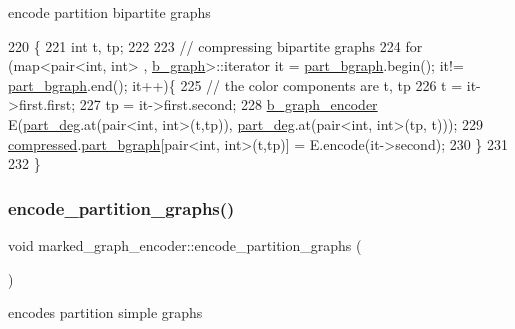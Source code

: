 encode partition bipartite graphs 


\begin{DoxyCode}
220 \{
221   \textcolor{keywordtype}{int} t, tp;
222 
223   \textcolor{comment}{// compressing bipartite graphs }
224   \textcolor{keywordflow}{for} (map<pair<int, int> , \hyperlink{classb__graph}{b\_graph}>::iterator it = \hyperlink{classmarked__graph__encoder_a5faebef707fb681c0b6c2ccf64abc04c}{part\_bgraph}.begin(); it!=
      \hyperlink{classmarked__graph__encoder_a5faebef707fb681c0b6c2ccf64abc04c}{part\_bgraph}.end(); it++)\{
225     \textcolor{comment}{// the color components are t, tp}
226     t = it->first.first; 
227     tp = it->first.second; 
228     \hyperlink{classb__graph__encoder}{b\_graph\_encoder} E(\hyperlink{classmarked__graph__encoder_a55ea2edb2609dfc287432f61900d6ad1}{part\_deg}.at(pair<int, int>(t,tp)),
      \hyperlink{classmarked__graph__encoder_a55ea2edb2609dfc287432f61900d6ad1}{part\_deg}.at(pair<int, int>(tp, t)));
229     \hyperlink{classmarked__graph__encoder_ac2ded200860fdd2321f86dd76b28bcb3}{compressed}.\hyperlink{classmarked__graph__compressed_a7b3267063fba30b45eb21b3ba4e07536}{part\_bgraph}[pair<int, int>(t,tp)] = E.encode(it->second);
230   \}
231 
232 \}
\end{DoxyCode}
\mbox{\label{classmarked__graph__encoder_a654463d4b256b84225f5944b5e361ebf}} 
\subsubsection{\texorpdfstring{encode\+\_\+partition\+\_\+graphs()}{encode\_partition\_graphs()}}
{\footnotesize\ttfamily void marked\+\_\+graph\+\_\+encoder\+::encode\+\_\+partition\+\_\+graphs (\begin{DoxyParamCaption}{ }\end{DoxyParamCaption})\hspace{0.3cm}{\ttfamily [private]}}



encodes partition simple graphs 


